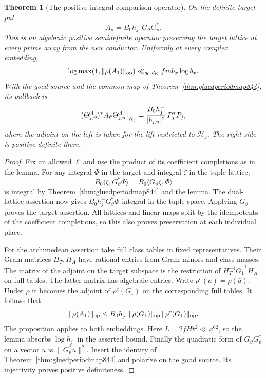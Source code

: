 \documentclass[a4paper,11pt]{article}
\newtheorem{theorem}[proposition]{Theorem}
\theoremstyle{definition}
\theoremstyle{remark}
\numberwithin{equation}{section}
\begin{document}
\begin{theorem}[The positive integral comparison operator]
\leavevmode\label{thm:integralcomparison845}
On the definite target put
\[
        A_\vartheta=B_0 h_j^-\,G_\vartheta G_\vartheta^*.
\]
This is an algebraic positive semidefinite operator preserving the
target lattice at every prime away from the new conductor. Uniformly
at every complex embedding,
\[
   \log\max(1,\|\rho(A_1)\|_{\rm op})
                \ll_{q_0,d_{\rm K}} f m b_x\log b_x .
\]
With the good source and the common map of
Theorem~\ref{thm:gluedperiodmap844}, its pullback is
\[
 (\Theta_{j,\vartheta}^{\rm cl})^*A_\vartheta
       \Theta_{j,\vartheta}^{\rm cl}\big|_{\mathcal H_j}
       = \frac{B_0h_j^-}{|b_{j,\vartheta}|^2}\,P_j^*P_j ,
\]
where the adjoint on the left is taken for the lift restricted
to \(\mathcal H_j\). The right side is positive definite there.
\end{theorem}
\begin{proof}
Fix an allowed \(\ell\) and use the product of its coefficient
completions as in the lemma. For any integral \(\Phi\) in the
target and integral \(\zeta\) in the tuple lattice,
\[
    B_0\langle\zeta,G_\vartheta^*\Phi\rangle
             =B_0\langle G_\vartheta\zeta,\Phi\rangle
\]
is integral by Theorem~\ref{thm:gluedperiodmap844} and the lemma.
The dual-lattice assertion now gives \(B_0h_j^-G_\vartheta^*\Phi\)
integral in the tuple space. Applying \(G_\vartheta\) proves the
target assertion. All lattices and linear maps split by the
idempotents of the coefficient completions, so this also proves
preservation at each individual place.

For the archimedean assertion take full class tables in fixed
representatives. Their Gram matrices \(H_T,H_A\) have rational
entries from Gram minors and class masses. The matrix of the
adjoint on the target subspace is the restriction of
\(H_T^{-1}\overline{G_1}^{\,\mathsf t}H_A\) on full tables.
The latter matrix has algebraic entries. Write \(\rho^c(a)=
\overline{\rho(\bar a)}\). Under \(\rho\) it becomes the
adjoint of \(\rho^c(G_1)\) on the corresponding full tables.
It follows that
\[
       \|\rho(A_1)\|_{\rm op}
        \le B_0h_j^-\,\|\rho(G_1)\|_{\rm op}\,
                               \|\rho^c(G_1)\|_{\rm op}.
\]
The proposition applies to both embeddings.
Here \(L=2fHt^2\ll x^{62}\), so the lemma absorbs
\(\log h_j^-\) in the asserted bound. Finally the quadratic
form of \(G_\vartheta G_\vartheta^*\) on a vector \(u\) is
\(\|G_\vartheta^*u\|^2\). Insert the identity of
Theorem~\ref{thm:gluedperiodmap844} and polarize on the good
source. Its injectivity proves positive definiteness.
\end{proof}
\clearpage
\end{document}
